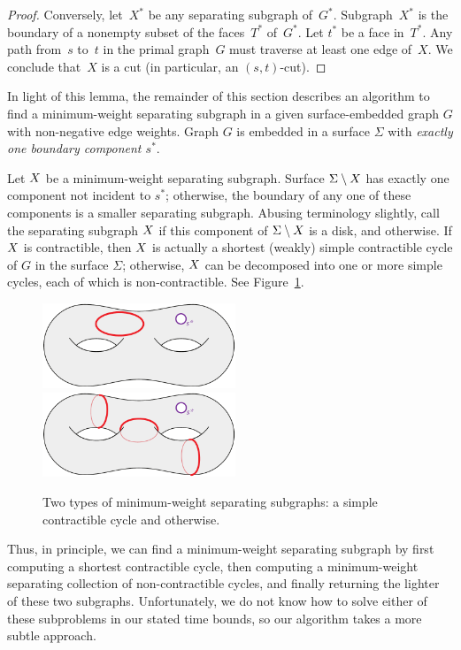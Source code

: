 \documentclass[letterpaper,review]{siamart190516}
\def\Cut{X}
\begin{document}
{\begin{proof}
  Conversely, let~$\Cut^*$ be any separating subgraph of~$G^*$.
  Subgraph~$\Cut^*$ is the boundary of a nonempty subset of the faces~$T^*$
  of~$G^*$.
  Let $t^*$ be a face in~$T^*$.
  Any path from~$s$ to~$t$ in the primal
  graph~$G$ must traverse at least one edge of~$\Cut$.  We conclude that~$\Cut$ is
  a cut (in particular, an $(s,t)$-cut).
\end{proof}

In light of this lemma, the remainder of this section describes an algorithm to find a minimum-weight separating subgraph in a given surface-embedded graph $G$ with non-negative edge weights.
Graph $G$ is embedded in a surface $\Sigma$ with \emph{exactly one boundary component $s^*$}.

Let $X$ be a minimum-weight separating subgraph.
Surface $\Sigma \setminus X$ has exactly one component not incident to $s^*$; otherwise, the
boundary of any one of these components is a smaller separating subgraph.
Abusing terminology slightly,
call the separating subgraph $X$  if this component of $\Sigma \setminus
X$ is a disk, and  otherwise.  If $X$ is contractible, then
$X$ is actually a shortest (weakly) simple contractible cycle of $G$ in the surface $\Sigma$; otherwise, $X$ can be decomposed into one or more simple cycles, each of which is non-contractible.  See Figure~\ref{fig:global_cases}.


\begin{figure}[ht]
\centering
\includegraphics[height=1in]{Fig/shortcon2}\qquad
\includegraphics[height=1in]{Fig/homologous4}
\caption{Two types of minimum-weight separating subgraphs: a simple contractible cycle and otherwise.}
\label{fig:global_cases}
\end{figure}

Thus, in principle, we can find a minimum-weight separating subgraph by first computing a shortest contractible cycle, then computing a minimum-weight separating collection of non-contractible cycles, and finally returning the lighter of these two subgraphs.  Unfortunately, we do not know how to solve either of these subproblems in our stated time bounds, so our algorithm takes a more subtle approach. 

}
\end{document}
